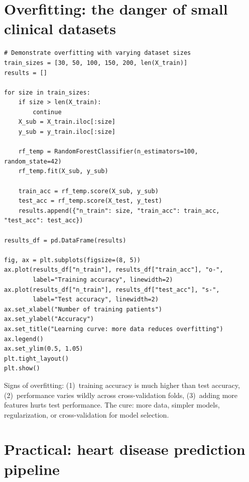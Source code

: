 \section{Overfitting: the danger of small clinical datasets}

\begin{verbatim}
# Demonstrate overfitting with varying dataset sizes
train_sizes = [30, 50, 100, 150, 200, len(X_train)]
results = []

for size in train_sizes:
    if size > len(X_train):
        continue
    X_sub = X_train.iloc[:size]
    y_sub = y_train.iloc[:size]

    rf_temp = RandomForestClassifier(n_estimators=100, random_state=42)
    rf_temp.fit(X_sub, y_sub)

    train_acc = rf_temp.score(X_sub, y_sub)
    test_acc = rf_temp.score(X_test, y_test)
    results.append({"n_train": size, "train_acc": train_acc, "test_acc": test_acc})

results_df = pd.DataFrame(results)

fig, ax = plt.subplots(figsize=(8, 5))
ax.plot(results_df["n_train"], results_df["train_acc"], "o-",
        label="Training accuracy", linewidth=2)
ax.plot(results_df["n_train"], results_df["test_acc"], "s-",
        label="Test accuracy", linewidth=2)
ax.set_xlabel("Number of training patients")
ax.set_ylabel("Accuracy")
ax.set_title("Learning curve: more data reduces overfitting")
ax.legend()
ax.set_ylim(0.5, 1.05)
plt.tight_layout()
plt.show()
\end{verbatim}

\begin{pythontip}
Signs of overfitting: (1)~training accuracy is much higher than test accuracy, (2)~performance varies wildly across cross-validation folds, (3)~adding more features hurts test performance. The cure: more data, simpler models, regularization, or cross-validation for model selection.
\end{pythontip}

\section{Practical: heart disease prediction pipeline}

